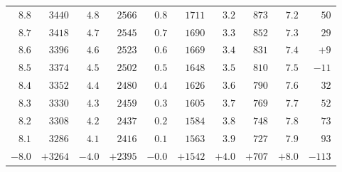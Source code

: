 \begin{center}
{\begin{tabular}{r|r||r|r||r|r||r|r||r|r}
$8.8$ & $3440$ & $4.8$ & $2566$ & $0.8$ & $1711$ & $3.2$ & $873$ & $7.2$ & $50$\\
$8.7$ & $3418$ & $4.7$ & $2545$ & $0.7$ & $1690$ & $3.3$ & $852$ & $7.3$ & $29$\\
$8.6$ & $3396$ & $4.6$ & $2523$ & $0.6$ & $1669$ & $3.4$ & $831$ & $7.4$ & $+9$\\
$8.5$ & $3374$ & $4.5$ & $2502$ & $0.5$ & $1648$ & $3.5$ & $810$ & $7.5$ & $-11$\\
$8.4$ & $3352$ & $4.4$ & $2480$ & $0.4$ & $1626$ & $3.6$ & $790$ & $7.6$ & $32$\\
$8.3$ & $3330$ & $4.3$ & $2459$ & $0.3$ & $1605$ & $3.7$ & $769$ & $7.7$ & $52$\\
$8.2$ & $3308$ & $4.2$ & $2437$ & $0.2$ & $1584$ & $3.8$ & $748$ & $7.8$ & $73$\\
$8.1$ & $3286$ & $4.1$ & $2416$ & $0.1$ & $1563$ & $3.9$ & $727$ & $7.9$ & $93$\\[4pt]
$-8.0$ & $+3264$ & $-4.0$ & $+2395$ & $-0.0$ & $+1542$ & $+4.0$ & $+707$ & $+8.0$ & $-113$
\end{tabular}}
\end{center}
\clearpage{}%
